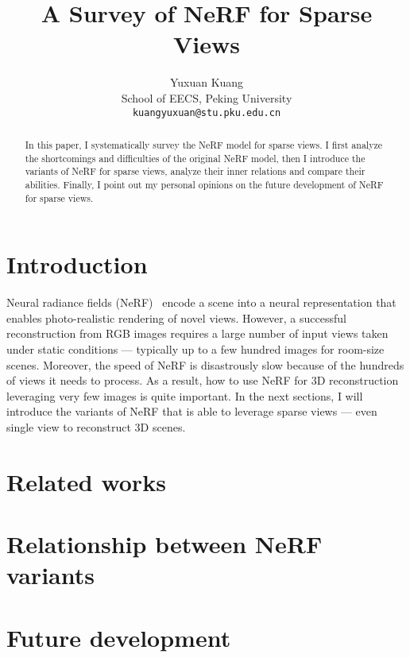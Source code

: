 \documentclass[10pt,twocolumn,letterpaper]{article}
\begin{document}
\title{A Survey of NeRF for Sparse Views}

\author{Yuxuan Kuang\\
School of EECS, Peking University\\
{\tt\small kuangyuxuan@stu.pku.edu.cn}
}

\maketitle

\begin{abstract}
   In this paper, I systematically survey the NeRF model for sparse views.
   I first analyze the shortcomings and difficulties of the original NeRF model,
   then I introduce the variants of NeRF for sparse views, analyze their inner relations and compare their abilities.
   Finally, I point out my personal opinions on the future development of NeRF for sparse views.
\end{abstract}


\section{Introduction}

Neural radiance fields (NeRF)~\cite{mildenhall2020nerf} encode a scene into a neural representation that enables photo-realistic rendering of novel views. However, a successful reconstruction from RGB images requires a large number of input views taken under static conditions — typically up to a few hundred images for room-size scenes.
Moreover, the speed of NeRF is disastrously slow because of the hundreds of views it needs to process.
As a result, how to use NeRF for 3D reconstruction leveraging very few images is quite important.
In the next sections, I will introduce the variants of NeRF that is able to leverage sparse views — even single view to reconstruct 3D scenes.

\section{Related works}

\section{Relationship between NeRF variants}

\section{Future development}

{\small


}
\end{document}
